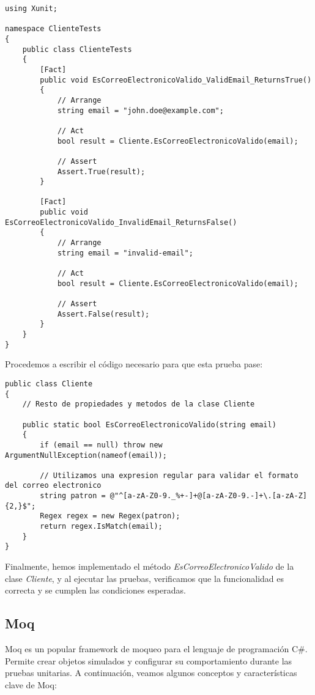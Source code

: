 \documentclass[executivepaper]{article}
\begin{document}
\begin{lstlisting}
using Xunit;

namespace ClienteTests
{
    public class ClienteTests
    {
        [Fact]
        public void EsCorreoElectronicoValido_ValidEmail_ReturnsTrue()
        {
            // Arrange
            string email = "john.doe@example.com";

            // Act
            bool result = Cliente.EsCorreoElectronicoValido(email);

            // Assert
            Assert.True(result);
        }

        [Fact]
        public void EsCorreoElectronicoValido_InvalidEmail_ReturnsFalse()
        {
            // Arrange
            string email = "invalid-email";

            // Act
            bool result = Cliente.EsCorreoElectronicoValido(email);

            // Assert
            Assert.False(result);
        }
    }
}
\end{lstlisting}

Procedemos a escribir el código necesario para que esta prueba pase:

\begin{lstlisting}
public class Cliente
{
    // Resto de propiedades y metodos de la clase Cliente

    public static bool EsCorreoElectronicoValido(string email)
    {
        if (email == null) throw new ArgumentNullException(nameof(email));
        
        // Utilizamos una expresion regular para validar el formato del correo electronico
        string patron = @"^[a-zA-Z0-9._%+-]+@[a-zA-Z0-9.-]+\.[a-zA-Z]{2,}$";
        Regex regex = new Regex(patron);
        return regex.IsMatch(email);
    }
}
\end{lstlisting}

Finalmente, hemos implementado el método \emph{EsCorreoElectronicoValido} de la clase \emph{Cliente}, y al ejecutar las pruebas, verificamos que la funcionalidad es correcta y se cumplen las condiciones esperadas.

\subsection{Moq}
Moq es un popular framework de moqueo para el lenguaje de programación C\#. Permite crear objetos simulados y configurar su comportamiento durante las pruebas unitarias. A continuación, veamos algunos conceptos y características clave de Moq:
\end{document}
